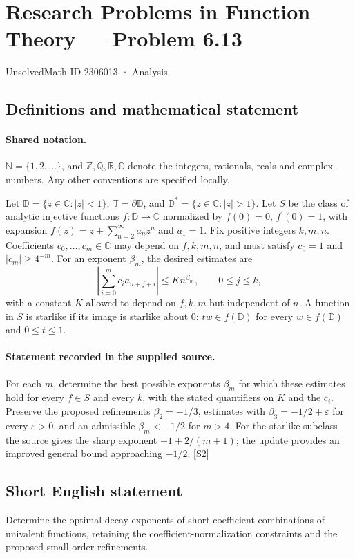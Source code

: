 \documentclass[11pt]{book}
\newcommand{\sref}[2]{\hyperlink{source:#1:#2}{[S#2]}}
\begin{document}
\setcounter{section}{2306012}
\section{Research Problems in Function Theory — Problem 6.13}\label{2306013}
{\small\sffamily UnsolvedMath ID 2306013 · Analysis}
\subsection{Definitions and mathematical statement}

\paragraph{Shared notation.}$\mathbb N=\{1,2,\ldots\}$, and $\mathbb Z,\mathbb Q,\mathbb R,\mathbb C$ denote the integers, rationals, reals and complex numbers. Any other conventions are specified locally.


Let $\mathbb D=\{z\in\mathbb C:|z|<1\}$, $\mathbb T=\partial\mathbb D$, and $\mathbb D^*=\{z\in\mathbb C:|z|>1\}$. Let $S$ be the class of analytic injective functions $f:\mathbb D\to\mathbb C$ normalized by $f(0)=0$, $f^{\prime}(0)=1$, with expansion $f(z)=z+\sum_{n=2}^{\infty}a_nz^n$ and $a_1=1$. Fix positive integers $k,m,n$. Coefficients $c_0,\ldots,c_m\in\mathbb C$ may depend on $f,k,m,n$, and must satisfy $c_0=1$ and $|c_m|\ge4^{-m}$. For an exponent $\beta_m$, the desired estimates are \[\left|\sum_{i=0}^mc_i a_{n+j+i}\right|\le K n^{\beta_m},\qquad 0\le j\le k,\] with a constant $K$ allowed to depend on $f,k,m$ but independent of $n$. A function in $S$ is starlike if its image is starlike about $0$: $tw\in f(\mathbb D)$ for every $w\in f(\mathbb D)$ and $0\le t\le1$.
\paragraph{Statement recorded in the supplied source.}
For each $m$, determine the best possible exponents $\beta_m$ for which these estimates hold for every $f\in S$ and every $k$, with the stated quantifiers on $K$ and the $c_i$. Preserve the proposed refinements $\beta_2=-1/3$, estimates with $\beta_3=-1/2+\varepsilon$ for every $\varepsilon>0$, and an admissible $\beta_m<-1/2$ for $m>4$. For the starlike subclass the source gives the sharp exponent $-1+2/(m+1)$; the update provides an improved general bound approaching $-1/2$. \sref{2306013}{2}
\subsection{Short English statement}
Determine the optimal decay exponents of short coefficient combinations of univalent functions, retaining the coefficient-normalization constraints and the proposed small-order refinements.
\end{document}
